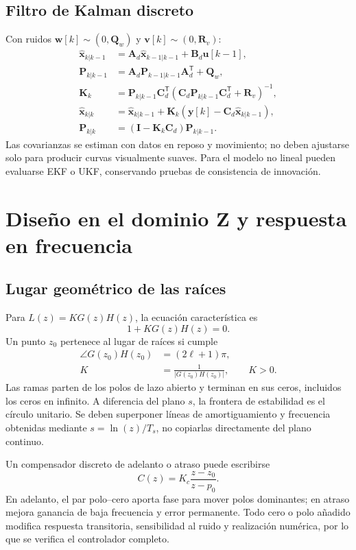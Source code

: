 \documentclass[11pt,letterpaper]{article}
\newcommand{\vect}[1]{\bm{#1}}
\newcommand{\mat}[1]{\bm{#1}}
\newcommand{\trans}{^{\mathsf T}}
\begin{document}
\subsection{Filtro de Kalman discreto}
Con ruidos $\vect w[k]\sim(0,\mat Q_w)$ y
$\vect v[k]\sim(0,\mat R_v)$:
\begin{align}
 \hat{\vect x}_{k|k-1}&=\mat A_d\hat{\vect x}_{k-1|k-1}+\mat B_d\vect u[k-1],\\
 \mat P_{k|k-1}&=\mat A_d\mat P_{k-1|k-1}\mat A_d\trans+\mat Q_w,\\
 \mat K_k&=\mat P_{k|k-1}\mat C_d\trans
 (\mat C_d\mat P_{k|k-1}\mat C_d\trans+\mat R_v)^{-1},\\
 \hat{\vect x}_{k|k}&=\hat{\vect x}_{k|k-1}+\mat K_k
 (\vect y[k]-\mat C_d\hat{\vect x}_{k|k-1}),\\
 \mat P_{k|k}&=(\mat I-\mat K_k\mat C_d)\mat P_{k|k-1}.
\end{align}
Las covarianzas se estiman con datos en reposo y movimiento; no deben ajustarse
solo para producir curvas visualmente suaves. Para el modelo no lineal pueden
evaluarse EKF o UKF, conservando pruebas de consistencia de innovación.

\section{Diseño en el dominio Z y respuesta en frecuencia}
\subsection{Lugar geométrico de las raíces}
Para $L(z)=K G(z)H(z)$, la ecuación característica es
\begin{equation}
 1+K G(z)H(z)=0.
\end{equation}
Un punto $z_0$ pertenece al lugar de raíces si cumple
\begin{align}
 \angle G(z_0)H(z_0)&=(2\ell+1)\pi,\\
 K&=\frac{1}{|G(z_0)H(z_0)|},\qquad K>0.
\end{align}
Las ramas parten de los polos de lazo abierto y terminan en sus ceros, incluidos
los ceros en infinito. A diferencia del plano $s$, la frontera de estabilidad
es el círculo unitario. Se deben superponer líneas de amortiguamiento y
frecuencia obtenidas mediante $s=\ln(z)/T_s$, no copiarlas directamente del
plano continuo.

Un compensador discreto de adelanto o atraso puede escribirse
\begin{equation}
 C(z)=K_c\frac{z-z_0}{z-p_0}.
\end{equation}
En adelanto, el par polo--cero aporta fase para mover polos dominantes; en
atraso mejora ganancia de baja frecuencia y error permanente. Todo cero o polo
añadido modifica respuesta transitoria, sensibilidad al ruido y realización
numérica, por lo que se verifica el controlador completo.
\end{document}
